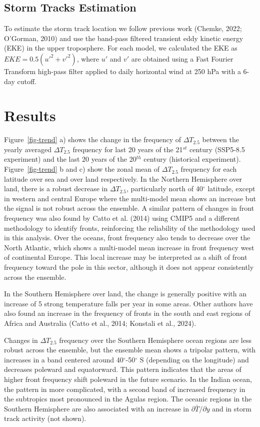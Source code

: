 \documentclass[
]{agujournal2019}
\begin{document}
\subsection{Storm Tracks Estimation}\label{sec-storm-track}

To estimate the storm track location we follow previous work (Chemke,
2022; O'Gorman, 2010) and use the band-pass filtered transient eddy
kinetic energy (EKE) in the upper troposphere. For each model, we
calculated the EKE as \(EKE = 0.5(u'^2 + v'^2)\), where \(u'\) and
\(v'\) are obtained using a Fast Fourier Transform high-pass filter
applied to daily horizontal wind at 250 hPa with a 6-day cutoff.

\section{Results}\label{results}

Figure~\ref{fig-trend} a) shows the change in the frequency of
\(\Delta T_{2.5}\) between the yearly averaged \(\Delta T_{2.5}\)
frequency for last 20 years of the 21\(^{st}\) century (SSP5-8.5
experiment) and the last 20 years of the 20\(^{th}\) century (historical
experiment). Figure~\ref{fig-trend} b and c) show the zonal mean of
\(\Delta T_{2.5}\) frequency for each latitude over sea and over land
respectively. In the Northern Hemisphere over land, there is a robust
decrease in \(\Delta T_{2.5}\), particularly north of 40\(^{\circ}\)
latitude, except in western and central Europe where the multi-model
mean shows an increase but the signal is not robust across the ensemble.
A similar pattern of changes in front frequency was also found by Catto
et al. (2014) using CMIP5 and a different methodology to identify
fronts, reinforcing the reliability of the methodology used in this
analysis. Over the oceans, front frequency also tends to decrease over
the North Atlantic, which shows a multi-model mean increase in front
frequency west of continental Europe. This local increase may be
interpreted as a shift of front frequency toward the pole in this
sector, although it does not appear consistently across the ensemble.

In the Southern Hemisphere over land, the change is generally positive
with an increase of 5 strong temperature falls per year in some areas.
Other authors have also found an increase in the frequency of fronts in
the south and east regions of Africa and Australia (Catto et al., 2014;
Konstali et al., 2024).

Changes in \(\Delta T_{2.5}\) frequency over the Southern Hemisphere
ocean regions are less robust across the ensemble, but the ensemble mean
shows a tripolar pattern, with increases in a band centered around
40\(^{\circ}\)-50\(^{\circ}\) S (depending on the longitude) and
decreases poleward and equatorward. This pattern indicates that the
areas of higher front frequency shift poleward in the future scenario.
In the Indian ocean, the pattern in more complicated, with a second band
of increased frequency in the subtropics most pronounced in the Agulas
region. The oceanic regions in the Southern Hemisphere are also
associated with an increase in \(\partial \bar{T}/ \partial y\) and in
storm track activity (not shown).
\end{document}
